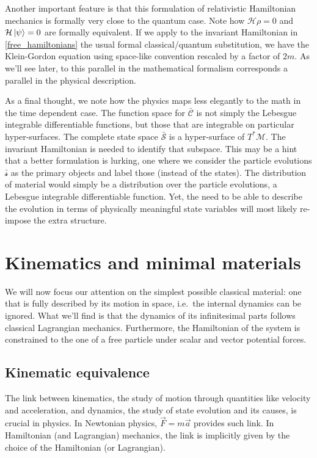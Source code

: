 \documentclass[aps,pra,10pt,twocolumn,floatfix,nofootinbib]{revtex4-1}
\numberwithin{equation}{section}
\theoremstyle{definition}
\begin{document}
Another important feature is that this formulation of relativistic Hamiltonian mechanics is formally very close to the quantum case. Note how $\mathcal{H} \rho = 0$ and $\mathcal{H} \ket{\psi} = 0$ are formally equivalent. If we apply to the invariant Hamiltonian in \ref{free_hamiltonians} the usual formal classical/quantum substitution, we have the Klein-Gordon equation using space-like convention rescaled by a factor of $2m$. As we'll see later, to this parallel in the mathematical formalism corresponds a parallel in the physical description.

As a final thought, we note how the physics maps less elegantly to the math in the time dependent case. The function space for $\bar{\mathcal{C}}$ is not simply the Lebesgue integrable differentiable functions, but those that are integrable on particular hyper-surfaces. The complete state space $\bar{\mathcal{S}}$ is a hyper-surface of $T^*\mathcal{M}$. The invariant Hamiltonian is needed to identify that subspace. This may be a hint that a better formulation is lurking, one where we consider the particle evolutions $\bar{\mathcal{s}}$ as the primary objects and label those (instead of the states). The distribution of material would simply be a distribution over the particle evolutions, a Lebesgue integrable differentiable function. Yet, the need to be able to describe the evolution in terms of physically meaningful state variables will most likely re-impose the extra structure.

\section{Kinematics and minimal materials}

We will now focus our attention on the simplest possible classical material: one that is fully described by its motion in space, i.e.~the internal dynamics can be ignored. What we'll find is that the dynamics of its infinitesimal parts follows classical Lagrangian mechanics. Furthermore, the Hamiltonian of the system is constrained to the one of a free particle under scalar and vector potential forces.

\subsection{Kinematic equivalence}

The link between kinematics, the study of motion through quantities like velocity and acceleration, and dynamics, the study of state evolution and its causes, is crucial in physics. In Newtonian physics, $\vec{F}=m\vec{a}$ provides such link. In Hamiltonian (and Lagrangian) mechanics, the link is implicitly given by the choice of the Hamiltonian (or Lagrangian).
\end{document}
